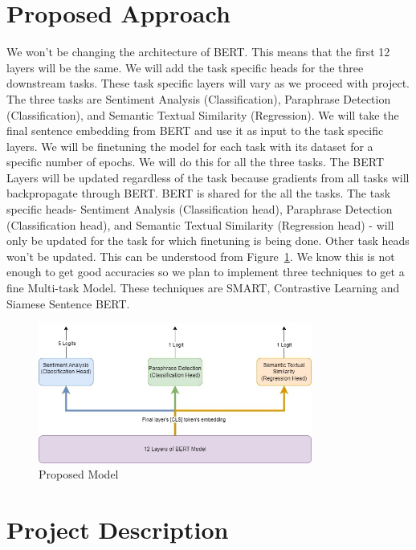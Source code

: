\section{Proposed Approach}
We won’t be changing the architecture of BERT. This means that the first 12 layers will be the same. We will add the task specific heads for the three downstream tasks. These task specific layers will vary as we proceed with project. The three tasks are Sentiment Analysis (Classification), Paraphrase Detection (Classification), and Semantic Textual Similarity (Regression). We will take the final sentence embedding from BERT and use it as input to the task specific layers. We will be finetuning the model for each task with its dataset for a specific number of epochs. We will do this for all the three tasks. The BERT Layers will be updated regardless of the task because gradients from all tasks will backpropagate through BERT. BERT is shared for the all the tasks. The task specific heads- Sentiment Analysis (Classification head), Paraphrase Detection (Classification head), and Semantic Textual Similarity (Regression head) - will only be updated for the task for which finetuning is being done. Other task heads won't be updated. This can be understood from Figure~\ref{PM}. We know this is not enough to get good accuracies so we plan to implement three techniques to get a fine Multi-task Model. These techniques are SMART, Contrastive Learning and Siamese Sentence BERT.

\begin{figure}[ht!]
\centering
\includegraphics[width=90mm]{Figures/Proposed_Model.jpg}
\caption{Proposed Model\label{PM}}
\end{figure}
\section{Project Description}

